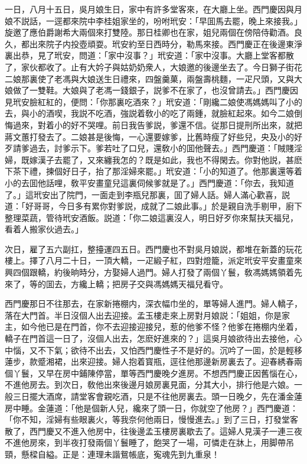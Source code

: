 一日，八月十五日，吳月娘生日，家中有許多堂客來，在大廳上坐。西門慶因與月娘不説話，一逕都來院中李桂姐家坐的，吩咐玳安：「早囬馬去罷，晚上來接我。」旋邀了應伯爵謝希大兩個來打雙陸。那日桂卿也在家，姐兒兩個在傍陪侍勸酒。良久，都出來院子内投壺頑耍。玳安約至日西時分，勒馬來接。西門慶正在後邊東淨裏出恭，見了玳安，問道：「家中沒事？」玳安道：「家中沒事。大廳上堂客都散了，家伙都收了。止有大妗子與姑奶奶衆人，大娘邀的後邊坐去了。今日獅子街花二娘那裏使了老馮與大娘送生日禮來，四盤羹菓，兩盤壽桃麵，一疋尺頭，又與大娘做了一雙鞋。大娘與了老馮一錢銀子，説爹不在家了，也沒曾請去。」西門慶因見玳安臉紅紅的，便問：「你那裏吃酒來？」玳安道：「剛纔二娘使馮媽媽叫了小的去，與小的酒喫，我説不吃酒，強説着敎小的吃了兩鍾，就臉紅起來。如今二娘倒悔過來，對着小的好不哭哩。前日我告爹説，爹還不信。従那日提刑所出來，就把蔣文蕙打發去了。二娘甚是後悔，一心還要嫁爹，比舊時瘦了好些兒，央及小的好歹請爹過去，討爹示下。爹若吐了口兒，還敎小的囬他聲去。」西門慶道：「賊賤淫婦，既嫁漢子去罷了，又來纏我怎的？既是如此，我也不得閑去。你對他説，甚麽下茶下禮，揀個好日子，抬了那淫婦來罷。」玳安道：「小的知道了。他那裏還等着小的去囬他話哩，敎平安畫童兒這裏伺候爹就是了。」西門慶道：「你去，我知道了。」這玳安出了院門，一面走到李瓶兒那裏，囬了婦人話。婦人滿心歡喜，説道：「好哥哥，今日多有累你對爹説，成就了二娘此事。」於是親自洗手剔甲，廚下整理菜蔬，管待玳安酒飯。説道：「你二娘這裏沒人，明日好歹你來幫扶天福兒，看着人搬家伙過去。」

次日，雇了五六副扛，整擡運四五日。西門慶也不對吳月娘説，都堆在新蓋的玩花樓上。擇了八月二十日，一頂大轎，一疋緞子紅，四對燈籠，派定玳安平安畫童來興四個跟轎，約後晌時分，方娶婦人過門。婦人打發了兩個丫鬟，敎馮媽媽領着先來了，等的囬去，方纔上轎；把房子交與馮媽媽天福兒看守。

西門慶那日不往那去，在家新捲棚内，深衣幅巾坐的，單等婦人進門。婦人轎子，落在大門首。半日沒個人出去迎接。孟玉樓走來上房對月娘説：「姐姐，你是家主，如今他已是在門首，你不去迎接迎接兒，惹的他爹不怪？他爹在捲棚内坐着，轎子在門首這一日了，沒個人出去，怎麽好進來的？」這吳月娘欲待出去接他，心中惱，又不下氣；欲待不出去，又怕西門慶性子不是好的。沉吟了一囬，於是輕移蓮步，款蹙湘裙，出來迎接。婦人抱着寳瓶，逕往他那邊新房裏去了。迎春綉春兩個丫鬟，又早在房中鋪陳停當，單等西門慶晚夕進房。不想西門慶正因舊惱在心，不進他房去。到次日，敎他出來後邊月娘房裏見面，分其大小，排行他是六娘。一般三日擺大酒席，請堂客會親吃酒，只是不往他房裏去。頭一日晚夕，先在潘金蓮房中睡。金蓮道：「他是個新人兒，纔來了頭一日，你就空了他房？」西門慶道：「你不知，淫婦有些眼裏火，等我奈何他兩日，慢慢進去。」到了三日，打發堂客散了，西門慶又不進入他房中，往後邊孟玉樓房裏歇去了。這婦人見漢子一連三夜不進他房來，到半夜打發兩個丫鬟睡了，飽哭了一場，可憐走在牀上，用脚帶吊頸，懸樑自縊。正是：連理未諧鴛帳底，寃魂先到九重泉！

